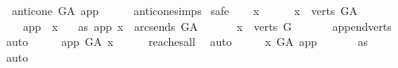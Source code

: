 \begin{isabellebody}
\ \ {\isachardoublequoteopen}anticone\ G{\isacharunderscore}{\kern0pt}A\ app\ {\isacharequal}{\kern0pt}\ {\isacharbraceleft}{\kern0pt}{\isacharbraceright}{\kern0pt}{\isachardoublequoteclose}\isanewline
%
\isadelimproof
\ \ %
\endisadelimproof
%
\isatagproof
{}\isamarkupfalse%
\ anticone{\isachardot}{\kern0pt}simps\isanewline
{}\isamarkupfalse%
\ safe\isanewline
\ \ \isamarkupfalse%
\ x\ \isanewline
\ \ \isamarkupfalse%
\ \ {\isachardoublequoteopen}x\ {\isasymin}\ verts\ G{\isacharunderscore}{\kern0pt}A{\isachardoublequoteclose}\isanewline
\ \ \ \ {\isachardoublequoteopen}app\ {\isasymnoteq}\ x{\isachardoublequoteclose}\isanewline
\ \ \ as{\isacharcolon}{\kern0pt}\ {\isachardoublequoteopen}{\isacharparenleft}{\kern0pt}app{\isacharcomma}{\kern0pt}\ x{\isacharparenright}{\kern0pt}\ {\isasymnotin}\ {\isacharparenleft}{\kern0pt}arcs{\isacharunderscore}{\kern0pt}ends\ G{\isacharunderscore}{\kern0pt}A{\isacharparenright}{\kern0pt}\isactrlsup {\isacharplus}{\kern0pt}\ {\isachardoublequoteclose}\isanewline
\ \ \isamarkupfalse%
\ \isamarkupfalse%
\ {\isachardoublequoteopen}x\ {\isasymin}\ verts\ G{\isachardoublequoteclose}\ \isanewline
\ \ \ \ \isamarkupfalse%
\ append{\isacharunderscore}{\kern0pt}verts\ \isamarkupfalse%
\ auto\isanewline
\ \ \isamarkupfalse%
\ \isamarkupfalse%
\ {\isachardoublequoteopen}app\ {\isasymrightarrow}\isactrlsup {\isacharplus}{\kern0pt}\isactrlbsub G{\isacharunderscore}{\kern0pt}A\isactrlesub \ x{\isachardoublequoteclose}\isanewline
\ \ \ \ \isamarkupfalse%
\ reaches{\isacharunderscore}{\kern0pt}all\ \isamarkupfalse%
\ auto\isanewline
\ \ \isamarkupfalse%
\ \isamarkupfalse%
\ {\isachardoublequoteopen}x\ {\isasymrightarrow}\isactrlsup {\isacharplus}{\kern0pt}\isactrlbsub G{\isacharunderscore}{\kern0pt}A\isactrlesub \ app{\isachardoublequoteclose}\ \isanewline
\ \ \ \ \isamarkupfalse%
\ as\ \isamarkupfalse%
\ auto\isanewline
{}\isamarkupfalse%
%
\endisatagproof
{\isafoldproof}%
%
\isadelimproof
\isanewline
%
\endisadelimproof
%
\isadelimtheory
%
\endisadelimtheory
%
\isatagtheory
{}\isamarkupfalse%
%
\endisatagtheory
{\isafoldtheory}%
%
\isadelimtheory
%
\endisadelimtheory
%
\end{isabellebody}%
\endinput
